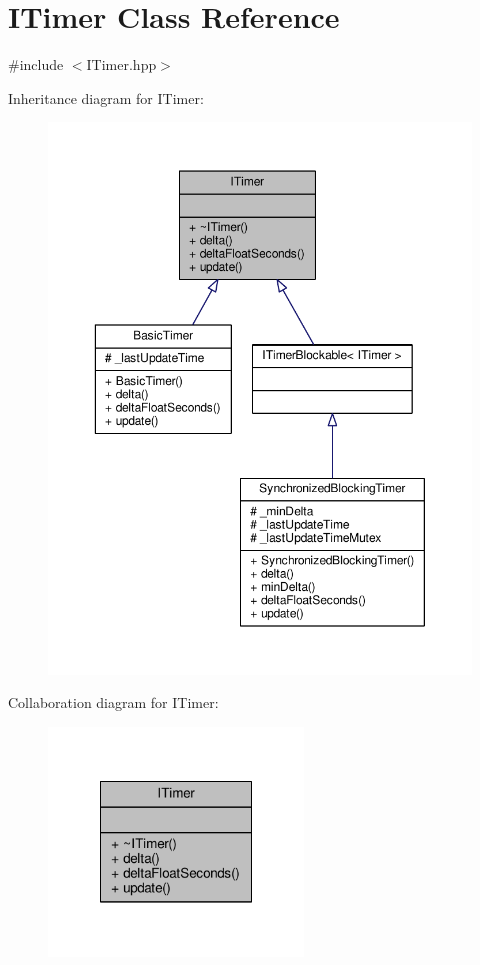 \hypertarget{class_i_timer}{\section{I\-Timer Class Reference}
\label{class_i_timer}
}


{\ttfamily \#include $<$I\-Timer.\-hpp$>$}



Inheritance diagram for I\-Timer\-:
\nopagebreak
\begin{figure}[H]
\begin{center}
\leavevmode
\includegraphics[width=350pt]{class_i_timer__inherit__graph}
\end{center}
\end{figure}


Collaboration diagram for I\-Timer\-:
\nopagebreak
\begin{figure}[H]
\begin{center}
\leavevmode
\includegraphics[width=192pt]{class_i_timer__coll__graph}
\end{center}
\end{figure}
